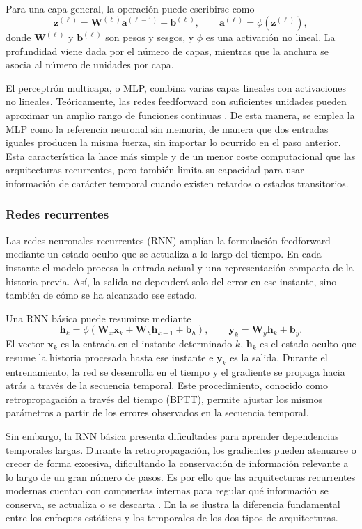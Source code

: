 Para una capa general, la operación puede escribirse como
\[
  \bm{z}^{(\ell)}=\bm{W}^{(\ell)}\bm{a}^{(\ell-1)}+\bm{b}^{(\ell)},\qquad
  \bm{a}^{(\ell)}=\phi(\bm{z}^{(\ell)}),
\]
donde $\bm{W}^{(\ell)}$ y $\bm{b}^{(\ell)}$ son pesos y sesgos, y $\phi$ es una
activación no lineal. La profundidad viene dada por el número de capas, mientras
que la anchura se asocia al número de unidades por capa.

El perceptrón multicapa, o MLP, combina varias capas lineales con activaciones
no lineales. Teóricamente, las redes feedforward con suficientes unidades pueden
aproximar un amplio rango de funciones continuas \cite{cybenko1989approximation}.
De esta manera, se emplea la MLP como la referencia neuronal sin memoria, de manera que
dos entradas iguales producen la misma fuerza, sin importar lo ocurrido en el paso anterior.
Esta característica la hace más simple y de un menor coste computacional que las arquitecturas
recurrentes, pero también limita su capacidad para usar información de carácter temporal
cuando existen retardos o estados transitorios.

\subsubsection{Redes recurrentes}

Las redes neuronales recurrentes (RNN) amplían la formulación feedforward
mediante un estado oculto que se actualiza a lo largo del tiempo. En cada
instante el modelo procesa la entrada actual y una representación compacta
de la historia previa. Así, la salida no dependerá solo del error en ese 
instante, sino también de cómo se ha alcanzado ese estado.

Una RNN básica puede resumirse mediante
\[
  \bm{h}_k=\phi(\bm{W}_x\bm{x}_k+\bm{W}_h\bm{h}_{k-1}+\bm{b}_h),\qquad
  \bm{y}_k=\bm{W}_y\bm{h}_k+\bm{b}_y.
\]
El vector $\bm{x}_k$ es la entrada en el instante determinado $k$, $\bm{h}_k$ 
es el estado oculto que resume la historia procesada hasta ese instante e
$\bm{y}_k$ es la salida. Durante el entrenamiento, la red se desenrolla en el
tiempo y el gradiente se propaga hacia atrás a través de la secuencia temporal.
Este procedimiento, conocido como retropropagación a través del tiempo (BPTT),
permite ajustar los mismos parámetros a partir de los errores observados en
la secuencia temporal.

Sin embargo, la RNN básica presenta dificultades para aprender dependencias
temporales largas. Durante la retropropagación, los gradientes pueden atenuarse 
o crecer de forma excesiva, dificultando la conservación de información relevante
a lo largo de un gran número de pasos. Es por ello que las arquitecturas recurrentes
modernas cuentan con compuertas internas para regular qué información se conserva,
se actualiza o se descarta \cite{bengio1994longterm}. En la  
se ilustra la diferencia fundamental entre los enfoques estáticos y los temporales de los
dos tipos de arquitecturas.

